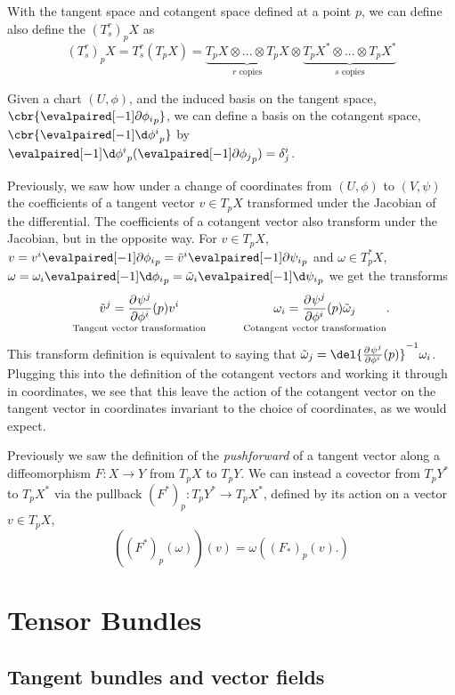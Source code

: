 With the tangent space and cotangent space defined at a point \(p\), we can define also define the  \((T_s^r)_pX\) as
\[(T_s^r)_pX = T_s^r(T_pX) = \underbrace{T_pX\otimes ... \otimes T_pX}_{r\text{ copies}} \otimes \underbrace{T_pX^*\otimes ... \otimes T_pX^*}_{s\text{ copies}} \]

Given a chart  \((U, \phi)\), and the induced basis on the tangent space, \(\cbr{\eval{\partial \phi_i}_p}\), we can define a basis on the cotangent space, \(\cbr{\eval{\d\phi^{i}}_p}\) by \(\eval{\d\phi^i}_p (\eval{\partial \phi_j}_p) = \delta^i_j\).

Previously, we saw how under a change of coordinates from \((U, \phi)\) to \((V, \psi)\) the coefficients of a tangent vector \(v\in T_pX\) transformed under the Jacobian of the differential.
The coefficients of a cotangent vector also transform under the Jacobian, but in the opposite way.
For \(v\in T_pX\), \(v = v^i \eval{\partial\phi_i}_p = \tilde v^i \eval{\partial \psi_i}_p\) and \(\omega \in T^*_pX\), \(\omega = \omega_i \eval{\d\phi_i}_p = \tilde \omega_i \eval{\d\psi_i}_p\) we get the transforms \[\underset{\text{Tangent vector transformation}}{\tilde v^j = \pd{\psi^j}{\phi^i}(p) v^i} \quad \quad \quad \underset{\text{Cotangent vector transformation}}{\omega_i = \pd{\psi^j}{\phi^i}(p)\tilde \omega_j}.\]
This transform definition is equivalent to saying that \(\tilde \omega_j = \del{\pd{\psi^j}{\phi^i}(p)}^{-1} \omega_i\).
Plugging this into the definition of the cotangent vectors and working it through in coordinates, we see that this leave the action of the cotangent vector on the tangent vector in coordinates invariant to the choice of coordinates, as we would expect.

Previously we saw the definition of the \emph{pushforward} of a tangent vector along a diffeomorphism \(F: X\to Y\) from \(T_pX\) to \(T_pY\).
We can instead  a covector from \(T_pY^*\) to \(T_pX^*\) via the pullback \((F^*)_p: T_pY^*\to T_pX^*\), defined by its action on a vector \(v\in T_pX\),
\[((F^*)_p(\omega))(v) = \omega((F_*)_p(v).)\]

\section{Tensor Bundles}
\label{sec:tensor_bundle}
\subsection{Tangent bundles and vector fields}

